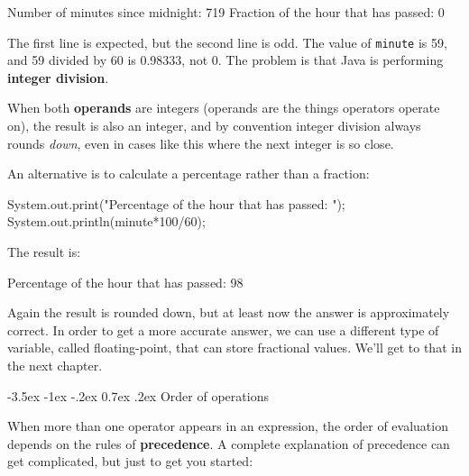 \documentclass{book}
\makeatletter
\renewcommand{\section}{\@startsection 
    {section} {1} {0mm}%
    {-3.5ex \@plus -1ex \@minus -.2ex}%
    {0.7ex \@plus.2ex}%
    {\normalfont\Large\bfseries}}
\makeatother
\begin{document}
\begin{verbatimtab}
Number of minutes since midnight: 719
Fraction of the hour that has passed: 0
\end{verbatimtab}
%
The first line is expected, but the second line is
odd.  The value of {\tt minute} is 59, and
59 divided by 60 is 0.98333, not 0.  The problem is that
Java is performing {\bf integer division}.


When both {\bf operands} are integers (operands are the things
operators operate on), the result is also an integer,
and by convention integer division always rounds {\em down},
even in cases like this where the next integer is so close.

An alternative is to calculate a percentage
rather than a fraction:

\begin{verbatimtab}
    System.out.print("Percentage of the hour that has passed: ");
    System.out.println(minute*100/60);
\end{verbatimtab}
%
The result is:

\begin{verbatimtab}
Percentage of the hour that has passed: 98
\end{verbatimtab}
%
Again the result is rounded down, but at least now the answer
is approximately correct.  In order to get a more accurate
answer, we can use a different type of variable, called
floating-point, that can store fractional values.
We'll get to that in the next chapter.


\section{Order of operations}

When more than one operator appears in an expression, the order
of evaluation depends on the rules of {\bf precedence}.  A
complete explanation of precedence can get complicated, but
just to get you started:
\end{document}
